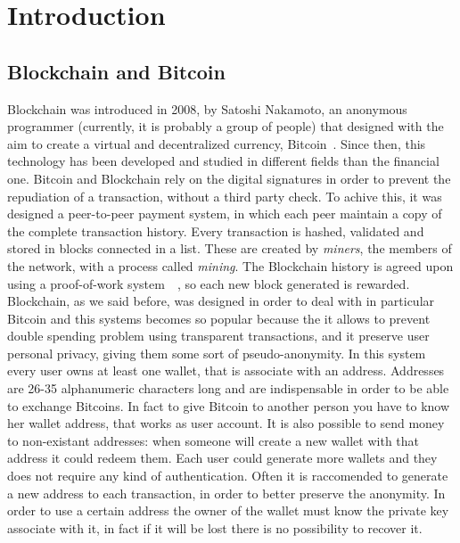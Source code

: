 \section{Introduction}

\subsection{Blockchain and Bitcoin}
Blockchain was introduced in 2008, by Satoshi Nakamoto, an anonymous programmer
(currently, it is probably a group of people) that designed with the aim to
create a virtual and decentralized currency, Bitcoin~\cite{satoshi}. Since
then, this technology has been developed and studied in different fields than
the financial one. Bitcoin and Blockchain rely on the digital signatures in
order to prevent the repudiation of a transaction, without a third party check.
To achive this, it was designed a peer-to-peer payment system, in which each
peer maintain a copy of the complete transaction history. Every transaction is
hashed, validated and stored in blocks connected in a list. These are created
by \textit{miners}, the members of the network, with a process called
\textit{mining}. The Blockchain history is agreed upon using a proof-of-work
system~\cite{pricing}~\cite{hashcash}, so each new block generated is rewarded.
Blockchain, as we said before, was designed in order to deal with
in particular Bitcoin and this systems becomes so popular because the it allows
to prevent double spending problem using transparent transactions, and it
preserve user personal privacy, giving them some sort of pseudo-anonymity.
In this system every user owns at least one wallet, that is associate with an
address. Addresses are 26-35 alphanumeric characters long and are indispensable
in order to be able to exchange Bitcoins. In fact to give Bitcoin to another
person you have to know her wallet address, that works as user account. It is
also possible to send money to non-existant addresses: when someone will create
a new wallet with that address it could redeem them. Each user could generate
more wallets and they does not require any kind of authentication. Often it is
raccomended to generate a new address to each transaction, in order to better
preserve the anonymity\cite{satoshi}. In order to use a certain address the
owner of the wallet must know the private key associate with it, in fact if it
will be lost there is no possibility to recover it. 


